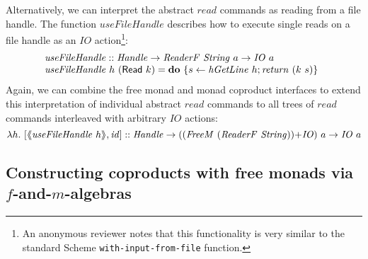 \documentclass{jfp1}
\newcommand{\fmext}[1]{\langle\kern-0.25em\langle #1 \rangle\kern-0.25em\rangle}
\newcommand{\kw}[1]{\textbf{#1}}
\begin{document}
Alternatively, we can interpret the abstract $\mathit{read}$ commands
as reading from a file handle. The function $\mathit{useFileHandle}$
describes how to execute single reads on a file handle as an
$\mathit{IO}$ action\footnote{An anonymous reviewer notes that this
  functionality is very similar to the standard Scheme
  \texttt{with-input-from-file} function.}:
\begin{displaymath}
  \begin{array}{@{}l}
    \mathit{useFileHandle} :: \mathit{Handle} \to \mathit{ReaderF}~\mathit{String}~a \to \mathit{IO}~a \\
    \mathit{useFileHandle}~h~(\mathsf{Read}~k) = \kw{do}~\{ s \leftarrow \mathit{hGetLine}~h; \mathit{return}~(k~s) \}
  \end{array}
\end{displaymath}
Again, we can combine the free monad and monad coproduct interfaces to
extend this interpretation of individual abstract $\mathit{read}$
commands to all trees of $\mathit{read}$ commands interleaved with
arbitrary $\mathit{IO}$ actions:
\begin{displaymath}
  \lambda h.~[\fmext{\mathit{useFileHandle}~h}, \mathit{id}] :: \mathit{Handle} \to (\cprd{(\mathit{FreeM}~(\mathit{ReaderF}~\mathit{String}))}{\mathit{IO}})~a \to \mathit{IO}~a
\end{displaymath}

\subsection{Constructing coproducts with free monads via \texorpdfstring{$f$}{f}-and-\texorpdfstring{$m$}{m}-algebras}
\label{sec:construct-coproducts}
\end{document}
